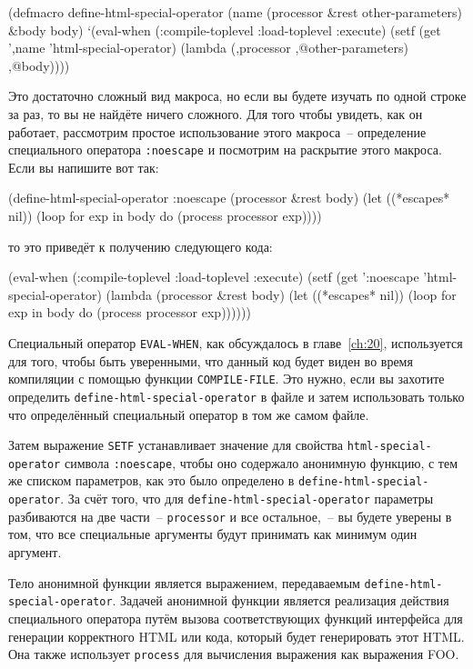 \begin{myverb}
(defmacro define-html-special-operator (name (processor &rest other-parameters) &body body)
  `(eval-when (:compile-toplevel :load-toplevel :execute)
     (setf (get ',name 'html-special-operator)
           (lambda (,processor ,@other-parameters) ,@body))))
\end{myverb}

Это достаточно сложный вид макроса, но если вы будете изучать по одной строке за раз, то
вы не найдёте ничего сложного.  Для того чтобы увидеть, как он работает, рассмотрим
простое использование этого макроса~-- определение специального оператора
\lstinline{:noescape} и посмотрим на раскрытие этого макроса.  Если вы напишите вот так:

\begin{myverb}
(define-html-special-operator :noescape (processor &rest body)
  (let ((*escapes* nil))
    (loop for exp in body do (process processor exp))))
\end{myverb}

\noindent{}то это приведёт к получению следующего кода:

\begin{myverb}
(eval-when (:compile-toplevel :load-toplevel :execute)
  (setf (get ':noescape 'html-special-operator)
        (lambda (processor &rest body)
          (let ((*escapes* nil))
            (loop for exp in body do (process processor exp))))))
\end{myverb}

Специальный оператор \lstinline{EVAL-WHEN}, как обсуждалось в главе~\ref{ch:20}, используется
для того, чтобы быть уверенными, что данный код будет виден во время компиляции с помощью
функции \lstinline{COMPILE-FILE}.  Это нужно, если вы захотите определить
\lstinline{define-html-special-operator} в файле и затем использовать только что определённый
специальный оператор в том же самом файле.

Затем выражение \lstinline{SETF} устанавливает значение для свойства
\lstinline{html-special-operator} символа \lstinline{:noescape}, чтобы оно содержало
анонимную функцию, с тем же списком параметров, как это было определено в
\lstinline{define-html-special-operator}.  За счёт того, что для
\lstinline{define-html-special-operator} параметры разбиваются на две части~--
\lstinline{processor} и все остальное,~-- вы будете уверены в том, что все специальные
аргументы будут принимать как минимум один аргумент.

Тело анонимной функции является выражением, передаваемым
\lstinline{define-html-special-operator}.  Задачей анонимной функции является реализация
действия специального оператора путём вызова соответствующих функций интерфейса для
генерации корректного HTML или кода, который будет генерировать этот HTML.  Она также
использует \lstinline{process} для вычисления выражения как выражения FOO.

